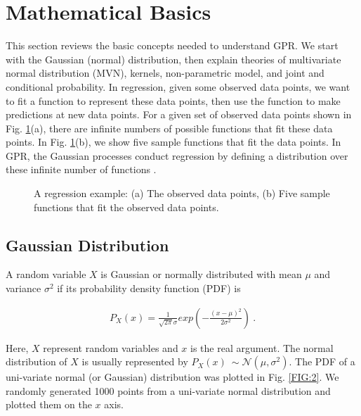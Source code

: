 \documentclass[preprint,12pt]{elsarticle}
\begin{document}
\section{Mathematical Basics}
This section reviews the basic concepts needed to understand GPR. We start with the Gaussian (normal) distribution, then explain theories of multivariate normal distribution (MVN), kernels, non-parametric model, and joint and conditional probability. In regression, given some observed data points, we want to fit a function to represent these data points, then use the function to make predictions at new data points. For a given set of observed data points shown in Fig. \ref{FIG:1}(a), there are infinite numbers of possible functions that fit these data points. In Fig. \ref{FIG:1}(b), we show five sample functions that fit the data points. In GPR, the Gaussian processes conduct regression by defining a distribution over these infinite number of functions \cite{ghahramani2011tutorial}.

\begin{figure}[h!]
    \centering
    \qquad
    \caption{A regression example: (a) The observed data points, (b) Five sample functions that fit the observed data points.}%
    \label{FIG:1}
\end{figure}

\subsection{Gaussian Distribution}

A random variable $X$ is Gaussian or normally distributed with mean $\mu$ and variance $\sigma^2$ if its probability density function (PDF) is \cite{Murphy2012}

\begin{ceqn}
    \begin{align}
       P_X(x) = \frac{1}{\sqrt{2 \pi} \sigma} exp{\left(-\frac{{\left(x - \mu \right)}^{2}}{2 \sigma^{2}}\right)} \ . \nonumber
    \end{align}
\end{ceqn}
Here, $X$ represent random variables and $x$ is the real argument. The normal distribution of $X$ is usually represented by $ P_X(x) ~ \sim\mathcal{N}(\mu, \sigma^2)$. The PDF of a uni-variate normal (or Gaussian) distribution was plotted in Fig. \ref{FIG:2}. We randomly generated 1000 points from a uni-variate normal distribution and plotted them on the $x$ axis.
\end{document}
